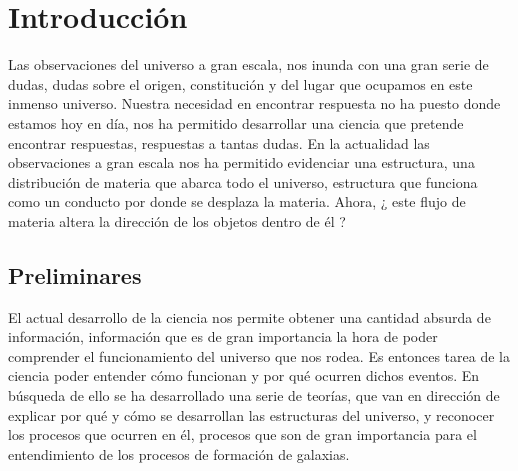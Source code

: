 



\chapter{Introducción}
\label{cha:Introduction}

Las observaciones del universo a gran escala, nos inunda con una gran serie de dudas, dudas sobre el origen, constitución y del lugar que ocupamos en este inmenso universo. Nuestra necesidad en encontrar respuesta no ha puesto donde estamos hoy en día, nos ha permitido desarrollar una ciencia que pretende encontrar respuestas, respuestas a tantas dudas. En la actualidad las observaciones a gran escala nos ha permitido evidenciar una estructura, una distribución de materia que abarca todo el universo, estructura que funciona como un conducto por donde se desplaza la materia. Ahora, ¿ este flujo de materia altera la dirección de los objetos dentro de él ?
 
\section{Preliminares }
\label{sec: prelimenares}

El actual desarrollo de la ciencia nos permite obtener una cantidad absurda de información,  información que es de gran importancia la hora de poder comprender el funcionamiento del universo que nos rodea. Es entonces tarea de la ciencia poder entender cómo funcionan y por qué ocurren dichos eventos. En búsqueda de ello se ha desarrollado una serie de teorías, que van en dirección de explicar por qué y cómo se desarrollan las estructuras del universo, y reconocer los procesos que ocurren en él, procesos que son de gran importancia para el entendimiento de los procesos de formación de galaxias. 
 

 
 

